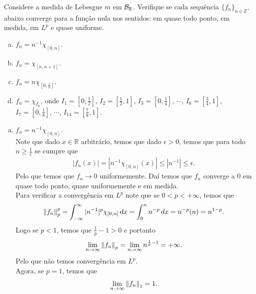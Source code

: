 \begin{homeworkProblem}[6]
  Considere a medida de Lebesgue $m$ em $\mathcal{B}_{\mathbb{R}}$. Verifique se cada sequência $\{f_n\}_{n\in\mathbb{Z}^{+}}$ abaixo converge para a função nula nos sentidos: em quase todo ponto, em medida, em $L^{p}$ e quase uniforme.
  \begin{enumerate}[a)]
    \item $f_n=n^{-1}\chi_{[0,n]}$.
    \item $f_n=\chi_{[n,n+1]}$.
    \item $f_n=n\chi_{[0,\frac{1}{n}]}$.
    \item $f_n=\chi_{I_n}$, onde $I_1=[0,\frac{1}{2}]$, $I_2=[\frac{1}{2},1]$, $I_3=[0,\frac{1}{4}]$, $\cdots$, $I_6=[\frac{3}{4}, 1]$, $I_7=[0,\frac{1}{8}]$, $\cdots$, $I_{14}=[\frac{7}{8},1]$. 
  \end{enumerate}
  \begin{solution}
    \begin{enumerate}[a)]
      \item $f_n=n^{-1}\chi_{[0,n]}$.\\
        Note que dado $x\in \mathbb{R}$ arbitrário, temos que dado $\epsilon>0$, temos que para todo $n\geq \frac{1}{\epsilon}$ se cumpre que
        \begin{align*}
          \left| f_n(x) \right|=\left| n^{-1}\chi_{[0,n]}(x) \right|\leq \left| n^{-1} \right|\leq \epsilon.
        \end{align*}
        Pelo que temos que $f_n\to 0$ uniformemente. Daí temos que $f_n$ converge a $0$ em quase todo ponto, quase uniformemente e em medida.\\
        Para verificar a convergência em $L^{p}$ note que se $0<p<+\infty$, temos que
        \begin{align*}
          \left\|f_n\right\|_{p}^{p}=\int_{-\infty}^{\infty}|n^{-1}|^{p}\chi_{[0,n]}\,dx=\int_{0}^{n}n^{-p}\,dx=n^{-p}(n)=n^{1-p}.
        \end{align*}
        Logo se $p<1$, temos que $\frac{1}{p}-1>0$ e portanto
        \begin{align*}
          \lim_{n \to \infty}\left\|f_n\right\|_{p}=\lim_{n \to \infty}n^{\frac{1}{p}-1}=+\infty.
        \end{align*}
        Pelo que não temos convergência em $L^{p}$.\\
        Agora, se $p=1$, temos que
        \begin{align*}
          \lim_{n \to \infty}\left\|f_n\right\|_{1}=1.
        \end{align*}

\end{enumerate}
\end{solution}
\end{homeworkProblem}
